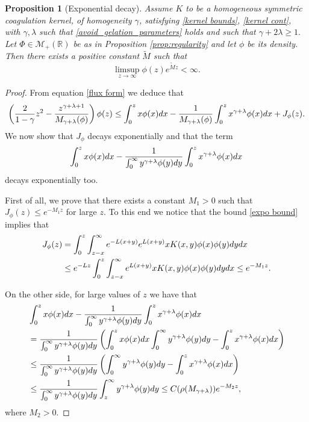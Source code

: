 \documentclass[11pt]{article}
\numberwithin{equation}{section}
\theoremstyle{plain}
\newtheorem{proposition}[theorem]{Proposition}
\newcommand{\der}{\textup{d}}
\begin{document}
\begin{proposition}[Exponential decay]\label{prop:expo decay}
Assume $K$ to be a homogeneous symmetric coagulation kernel, of homogeneity $\gamma$, satisfying
\eqref{kernel bounds},  \eqref{kernel cont},  with $\gamma , \lambda $ such that  \eqref{avoid_gelation_parameters} holds and such that $\gamma+2\lambda \geq  1.$
		Let $\Phi \in \mathcal M_+(\mathbb R) $ be as in Proposition \ref{prop:regularity}  and let $\phi$ be its density. 
	Then there exists a positive constant $\tilde{M}$ such that 
	\begin{equation}\label{expo decay}
\limsup_{z \rightarrow \infty } \phi(z) e^{\tilde{M} z } < \infty. 	
	\end{equation}
\end{proposition}
\begin{proof}
From equation \eqref{flux form} we deduce that 
\begin{align*}
\left( \frac{2}{1-\gamma} z^2 - \frac{z^{\gamma +\lambda +1 }}{M_{\gamma+\lambda}(\phi)} \right)  \phi(z)  
\leq \int_0^z x \phi(x) \der x - \frac{1}{M_{\gamma+\lambda}(\phi)}\int_0^z x^{\gamma +\lambda }\phi(x) \der x +  J_\phi(z). 
	\end{align*} 
We now show that $J_\phi$ decays exponentially and that the term 
\[
\int_0^z x \phi(x) \der x - \frac{1}{\int_0^\infty y^{\gamma + \lambda } \phi(y) \der y } \int_0^z x^{\gamma +\lambda }\phi(x) \der x 
\]
decays exponentially too. 

First of all, we prove that there exists a constant $M_1>0$ such that $ J_\phi(z) \leq e^{- M_1 z}$ for large $z$. 
To this end we notice that the bound \eqref{expo bound} implies that
\begin{align*}
 J_\phi(z)&= \int_0^z \int_{z-x}^\infty e^{- L(x+y) }e^{L(x+y) } x K(x,y) \phi(x) \phi(y) \der y \der x \\
& \leq  e^{- Lz  }  \int_0^z \int_{z-x}^\infty e^{L(x+y) } x K(x,y) \phi(x) \phi(y) \der y \der x  \leq e^{-M_1 z } . 
\end{align*} 

On the other side, for large values of $z$ we have that
\begin{align*}
&\int_0^z x \phi(x) \der x - \frac{1}{\int_0^\infty y^{\gamma + \lambda } \phi(y) \der y } \int_0^z x^{\gamma +\lambda }\phi(x) \der x  \\
&= \frac{1}{\int_0^\infty y^{\gamma + \lambda } \phi(y) \der y } \left(\int_0^z x \phi(x) \der x \int_0^\infty y^{\gamma + \lambda } \phi(y) \der y  - \int_0^z x^{\gamma +\lambda }\phi(x) \der x\right)   \\
& \leq \frac{1}{\int_0^\infty y^{\gamma + \lambda } \phi(y) \der y } \left( \int_0^\infty y^{\gamma + \lambda } \phi(y) \der y  - \int_0^z x^{\gamma +\lambda }\phi(x) \der x\right)   \\ 
& \leq  \frac{1}{\int_0^\infty y^{\gamma + \lambda } \phi(y) \der y }  \int_z^\infty y^{\gamma + \lambda } \phi(y) \der y \leq C(\rho(M_{\gamma + \lambda })) e^{- M_2 z },
\end{align*}
where $M_2 >0$.


\end{proof}
\end{document}
